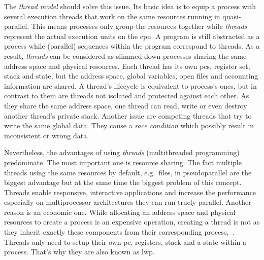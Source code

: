 The \textit{thread model} should solve this issue.
Its basic idea is to equip a process with several execution threads that work on the same resources running in quasi-parallel\cite{tanenbaum-modern-operating-systems}.
This means processes only group the resources together while \textit{threads} represent the actual execution units on the \ac{cpu}\cite{tanenbaum-modern-operating-systems}.
A program is still abstracted as a process while (parallel) sequences within the program correspond to threads.
As a result, \textit{threads} can be considered as slimmed down processes sharing the same address space and physical resources.
Each thread has its own \acp{pc}, register set, stack and state, but the address space, global variables, open files and accounting information are shared\cite{tanenbaum-modern-operating-systems}.
A thread's lifecycle is equivalent to process's ones, but in contrast to them are threads not isolated and protected against each other\cite{glatz2015betriebssysteme}.
As they share the same address space, one thread can read, write or even destroy another thread's private stack\cite{tanenbaum-modern-operating-systems}.
Another issue are competing threads that try to write the same global data.
They cause a \textit{race condition} which possibly result in inconsistent or wrong data\cite{brause2017betriebssysteme}.

Nevertheless, the advantages of using \textit{threads} (multithreaded programming) predominate.
The most important one is resource sharing. 
The fact multiple threads using the same resources by default, e.g.\ files, in pseudoparallel are the biggest advantage but at the same time the biggest problem of this concept.
Threads enable responsive, interactive applications and increase the performance especially on multiprocessor architectures they can run truely parallel\cite{silberschatz2009operating}.
Another reason is an economic one.
While allocating an address space and physical resources to create a process is an expensive operation, creating a thread is not as they inherit exactly these components from their corresponding process\cite{silberschatz2009operating},~\cite{mandl2014Grundkurs}.
Threads only need to setup their own \ac{pc}, registers, stack and a state within a process. 
That's why they are also known as \acf{lwp}\cite{mandl2014Grundkurs}.

